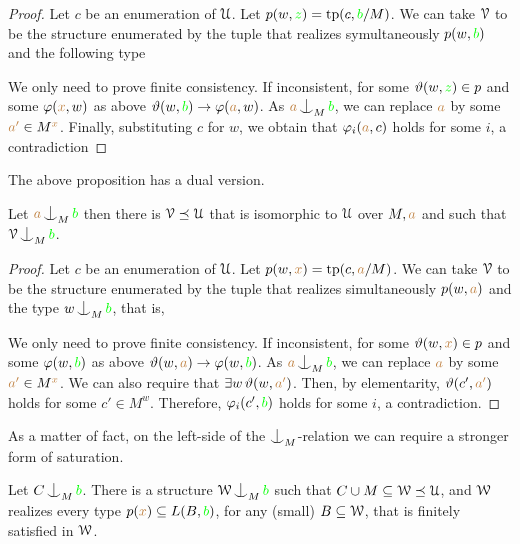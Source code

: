 \begin{proof}
  Let $c$ be an enumeration of $\EuScript U$.
  Let $p(w,{\color{green} z})={\rm tp}(c,{\color{green} b}/M)$.
  We can take $\EuScript V$ to be the structure enumerated by the tuple that realizes symultaneously $p(w,{\color{green} b}) $ and the following type 


  We only need to prove finite consistency.
  If inconsistent, for some $\vartheta(w,{\color{green} z})\in p$ and some $\varphi({\color{brown} x},w)$ as above $\vartheta(w,{\color{green} b})\rightarrow\varphi({\color{brown} a},w)$. 
  As ${\mr a}\nonfork_M{\gr b}$, we can replace ${\color{brown} a}$ by some ${\color{brown} a'}\in M^{\color{brown} x}$.
  Finally, substituting $c$ for $w$, we obtain that $\varphi_i({\color{brown} a},c)$ holds for some $i$, a contradiction
\end{proof}

The above proposition has a dual version.

\begin{proposition}\label{prop_saturate_coheir}
  Let ${\mr a}\nonfork_M{\gr b}$ then there is $\EuScript V\preceq\EuScript U$ that is isomorphic to $\EuScript U$ over $M,{\color{brown} a}$ and such that $\V\nonfork_M{\gr b}$.
\end{proposition}

\begin{proof}
  Let $c$ be an enumeration of $\EuScript U$.
  Let $p(w,{\color{brown} x})={\rm tp}(c,{\color{brown} a}/M)$.
  We can take $\EuScript V$ to be the structure enumerated by the tuple that realizes simultaneously $p(w,{\color{brown} a}) $ and the type $w\nonfork_M{\gr b}$, that is,


  We only need to prove finite consistency.
  If inconsistent, for some $\vartheta(w,{\color{brown} x})\in p$ and some $\varphi(w,{\color{green} b})$ as above $\vartheta(w,{\color{brown} a})\rightarrow\varphi(w, {\color{green} b})$.
  As ${\mr a}\nonfork_M{\gr b}$, we can replace ${\color{brown} a}$ by some ${\color{brown} a'}\in M^{\color{brown} x}$.
  We can also require that $\exists w\,\vartheta(w,{\color{brown} a'})$.
  Then, by elementarity, $\vartheta(c',{\color{brown} a'})$ holds for some $c'\in M^w$.
  Therefore, $\varphi_i(c',{\color{green} b})$ holds for some $i$, a contradiction.
\end{proof}

As a matter of fact, on the left-side of the $\nonfork_M$-relation we can require a stronger form of saturation.

\begin{proposition}\label{prop_b_saturate_coheir}
  Let $C\nonfork_M{\gr b}$.
  There is a structure $\W\nonfork_M{\gr b}$ such that $C\cup M\subseteq\EuScript W\preceq\EuScript U$, and $\EuScript W$ realizes every type $p({\color{brown} x})\subseteq L(B,{\color{green} b})$, for any (small) $B\subseteq\EuScript W$, that is finitely satisfied in $\EuScript W$.
\end{proposition}

